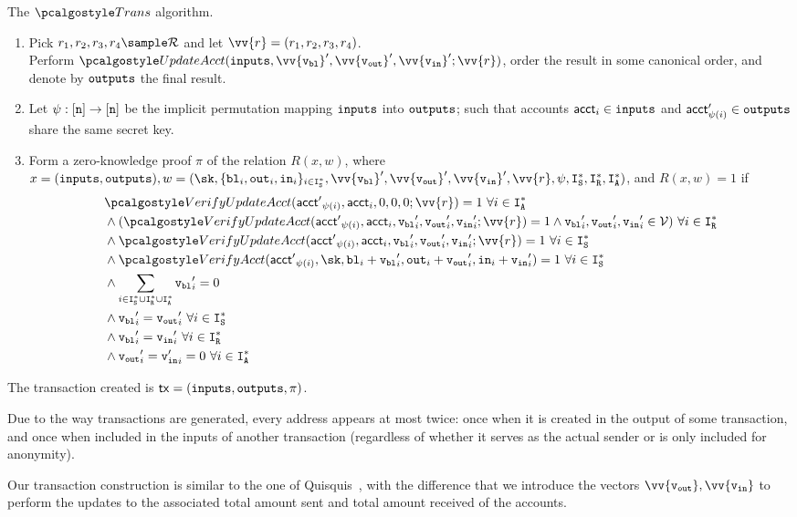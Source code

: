\begin{boxfig}{\label{fig:trans}{The $\trans$ algorithm.}}
\begin{enumerate}
        \item Pick $r_1, r_2, r_3, r_4 \sample \randspace$ and let $\vv{r} = (r_1, r_2, r_3, r_4)$. \\
        Perform $\updacc(\inputs,\vv{\vbl}^\prime, \vv{\vout}^\prime, \vv{\vin}^\prime; \vv{r})$, order the result in some canonical order, and denote by ${\textup{\texttt{outputs}}}$ the final result.
        \item Let $\psi:[{\textup{\texttt{n}}}]\rightarrow [{\textup{\texttt{n}}}]$ be the implicit permutation mapping ${\textup{\texttt{inputs}}}$ into ${\textup{\texttt{outputs}}}$; such that accounts $\textup{\textsf{acct}}_i \in {\textup{\texttt{inputs}}}$ and $\textup{\textsf{acct}}^\prime_{\psi(i)}\in {\textup{\texttt{outputs}}}$ share the same secret key.
        \item Form a zero-knowledge proof $\pi$ of the relation $R(x, w)$, where $x = (\inputs, \outputs), w = (\sk, \{{\varbl}_i, {\varout}_i, {\varin}_i\}_{i \in \isset^*}, \vv{\vbl}^\prime, \vv{\vout}^\prime, \vv{\vin}^\prime, \vv{r}, \psi, \isset^*, \irset^*, \ianset^*)$, and $R(x, w) = 1$ if 
        {\begin{align*}
            & \verupdacc({\acct'}_{\psi(i)},{\acct}_i,0,0,0;\vv{r})=1 \ \forall i \in \ianset^* \\
            & \wedge (\verupdacc({\acct'}_{\psi(i)},{\acct}_i, {\vbl}'_i, {\vout}'_i, {\vin}'_i ;\vv{r})=1 \wedge {\vbl}'_i, {\vout}'_i, {\vin}'_i \in \vset) \ \forall i \in \irset^* \\
            & \wedge \verupdacc({\acct'}_{\psi(i)}, {\acct}_{i}, {\vbl}'_{i}, {\vout}'_{i}, {\vin}'_{i}; \vv{r}) = 1 \ \forall i \in \isset^*\\
            & \wedge \veract({\acct'}_{\psi(i)}, \sk, \varbl_i + {\vbl}'_{i}, \varout_i + {\vout}'_{i}, \varin_i + {\vin}'_{i}) = 1  \ \forall i \in \isset^*\\
            & \wedge \sum_{i\in \isset^* \cup \irset^* \cup \ianset^*} {\vbl}'_i=0 \\
            & \wedge {\vbl}'_{i} = {\vout}'_{i} \ \forall i \in \isset^* \\
            & \wedge {\vbl}'_i = {\vin}'_i \ \forall i \in \irset^*\\
            & \wedge {\vout}'_i = {\vin'}_i = 0 \ \forall i \in \ianset^*
        \end{align*}}
    \end{enumerate}

    The transaction created is $\textup{\textsf{tx}}=({\textup{\texttt{inputs}}},{\textup{\texttt{outputs}}},\pi)$.

\end{boxfig}

Due to the way transactions are generated, every address appears at most twice: 
once when it is created in the output of some transaction, and once when included in the inputs of another transaction
(regardless of whether it serves as the actual sender or is only included for anonymity).

Our transaction construction is similar to the one of Quisquis~\cite{fauzi2019quisquis}, with the difference that we introduce the vectors $\vv{\vout}, \vv{\vin}$ to perform the updates to the associated total amount sent and total amount received of the accounts.